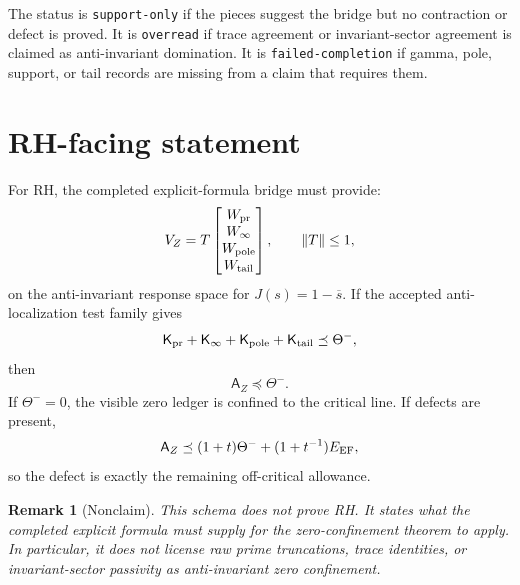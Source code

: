 \documentclass[11pt]{article}
\newtheorem{remark}[theorem]{Remark}
\newcommand{\K}{\mathsf K}
\newcommand{\A}{\mathsf A}
\begin{document}
The status is \texttt{support-only} if the pieces suggest the bridge but no contraction or defect is proved. It is \texttt{overread} if trace agreement or invariant-sector agreement is claimed as anti-invariant domination. It is \texttt{failed-completion} if gamma, pole, support, or tail records are missing from a claim that requires them.

\section{RH-facing statement}

For RH, the completed explicit-formula bridge must provide:
\[
  V_Z=T
  \begin{bmatrix}
    W_{\rm pr}\\ W_\infty\\ W_{\rm pole}\\ W_{\rm tail}
  \end{bmatrix},
  \qquad \|T\|\le1,
\]
on the anti-invariant response space for \(J(s)=1-\overline{s}\). If the accepted anti-localization test family gives
\[
  \K_{\rm pr}+\K_\infty+\K_{\rm pole}+\K_{\rm tail}\preceq\Theta^-,
\]
then
\[
  \A_Z\preceq\Theta^-.
\]
If \(\Theta^-=0\), the visible zero ledger is confined to the critical line. If defects are present,
\[
  \A_Z\preceq (1+t)\Theta^-+(1+t^{-1})E_{\rm EF},
\]
so the defect is exactly the remaining off-critical allowance.

\begin{remark}[Nonclaim]
This schema does not prove RH. It states what the completed explicit formula must supply for the zero-confinement theorem to apply. In particular, it does not license raw prime truncations, trace identities, or invariant-sector passivity as anti-invariant zero confinement.
\end{remark}
\end{document}

